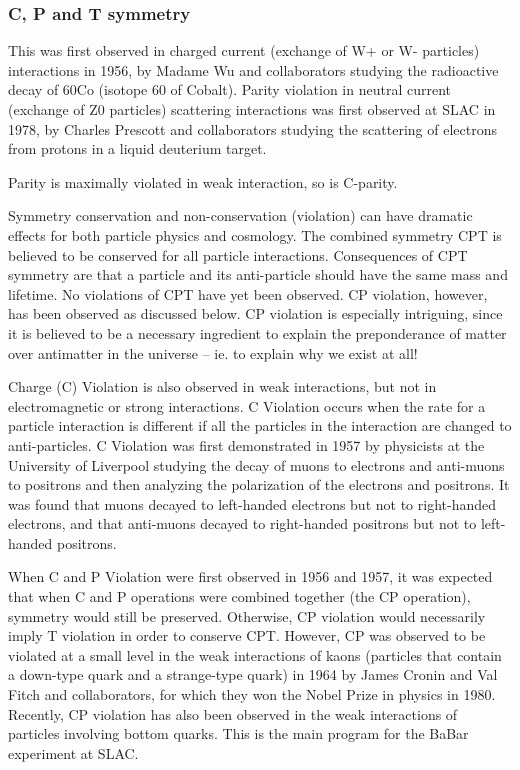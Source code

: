 \subsubsection{C, P and T symmetry}
This was first observed in charged current (exchange of W+ or W- particles) 
interactions in 1956, by Madame Wu and collaborators studying the radioactive 
decay of 60Co (isotope 60 of Cobalt). Parity violation in neutral current 
(exchange of Z0 particles) scattering interactions was first observed at SLAC 
in 1978, by Charles Prescott and collaborators studying the scattering of 
electrons from protons in a liquid deuterium target.

Parity is maximally violated in weak interaction, so is C-parity.

Symmetry conservation and non-conservation (violation) can have dramatic effects 
for both particle physics and cosmology. The combined symmetry CPT is believed 
to be conserved for all particle interactions. Consequences of CPT symmetry are 
that a particle and its anti-particle should have the same mass and lifetime.
No violations of CPT have yet been observed. CP violation, however, has been 
observed as discussed below. CP violation is especially intriguing, since it 
is believed to be a necessary ingredient to explain the preponderance of matter 
over antimatter in the universe -- ie. to explain why we exist at all!

Charge (C) Violation is also observed in weak interactions, but not in 
electromagnetic or strong interactions. C Violation occurs when the rate for a 
particle interaction is different if all the particles in the interaction are 
changed to anti-particles. C Violation was first demonstrated in 1957 by 
physicists at the University of Liverpool studying the decay of muons to 
electrons and anti-muons to positrons and then analyzing the polarization of 
the electrons and positrons.  It was found that muons decayed to left-handed 
electrons but not to right-handed electrons, and that anti-muons decayed to 
right-handed positrons but not to left-handed positrons.

When C and P Violation were first observed in 1956 and 1957, it was expected 
that when C and P operations were combined together (the CP operation), 
symmetry would still be preserved.  Otherwise, CP violation would necessarily 
imply T violation in order to conserve CPT. However, CP was observed to be 
violated at a small level in the weak interactions of kaons (particles that 
contain a down-type quark and a strange-type quark) in 1964 by James Cronin 
and Val Fitch and collaborators, for which they won the Nobel Prize in physics 
in 1980. Recently, CP violation has also been observed in the weak interactions 
of particles involving bottom quarks. This is the main program for the BaBar 
experiment at SLAC.

